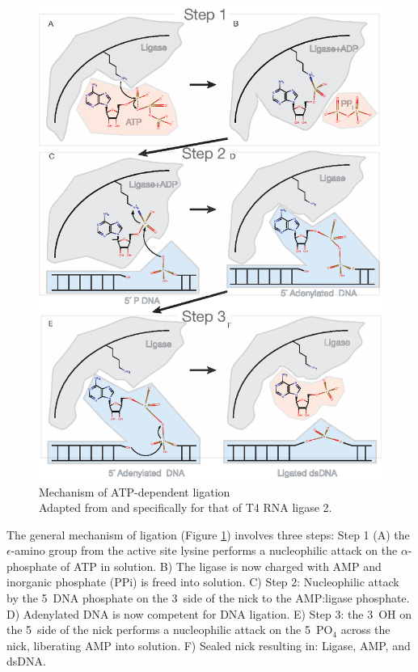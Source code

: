     \begin{figure}%
      \centering
      \includegraphics{Figures/Intro/LigationMechanism.eps}
      \caption[Mechanism of Rnl2 ATP-dependent ligation]
      {
        Mechanism of ATP-dependent ligation\\[0.25cm]
        Adapted from \citep{Nandakumar2006} and specifically for that of T4 RNA ligase 2.
        }
      \label{Intro:fig:Ligation Mechanism}
      \end{figure}

    The general mechanism of ligation (Figure \ref{Intro:fig:Ligation Mechanism}) involves three steps: Step 1 (A) the $\epsilon$-amino group from the active site lysine performs a nucleophilic attack on the $\alpha$-phosphate of ATP in solution. B) The ligase is now charged with AMP and inorganic phosphate (PPi) is freed into solution. C) Step 2: Nucleophilic attack by the 5\textprime~DNA phosphate on the 3\textprime~side of the nick to the AMP:ligase phosphate. D) Adenylated DNA is now competent for DNA ligation. E) Step 3: the 3\textprime~OH on the 5\textprime~side of the nick performs a nucleophilic attack on the 5\textprime~PO$_{4}$ across the nick, liberating AMP into solution. F) Sealed nick resulting in: Ligase, AMP, and dsDNA.

